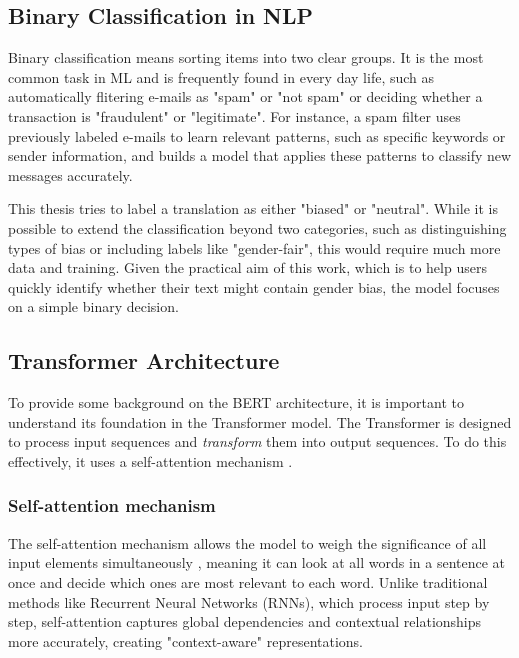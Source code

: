 \subsection{Binary Classification in NLP}
    Binary classification means sorting items into two clear groups. It is the most common task in ML and is frequently found in every day life, such as automatically flitering e-mails as "spam" or "not spam" \parencite{quemyBinaryClassificationUnstructured2019} or deciding whether a transaction is "fraudulent" or "legitimate". For instance, a spam filter uses previously labeled e-mails to learn relevant patterns, such as specific keywords or sender information, and builds a model that applies these patterns to classify new messages accurately. 
    
    This thesis tries to label a translation as either "biased" or "neutral". While it is possible to extend the classification beyond two categories, such as distinguishing types of bias or including labels like "gender-fair", this would require much more data and training. Given the practical aim of this work, which is to help users quickly identify whether their text might contain gender bias, the model focuses on a simple binary decision.

\subsection{Transformer Architecture} \label{subsection:transformer_arch}
  To provide some background on the BERT architecture, it is important to understand its foundation in the Transformer model. The Transformer is designed to process input sequences and \textit{transform} them into output sequences. To do this effectively, it uses a self-attention mechanism \parencite{phuongFormalAlgorithmsTransformers2022}.

    \subsubsection{Self-attention mechanism}
    The self-attention mechanism allows the model to weigh the significance of all input elements simultaneously \parencite{xiaoIntroductionTransformersNLP2023}, meaning it can look at all words in a sentence at once and decide which ones are most relevant to each word. Unlike traditional methods like Recurrent Neural Networks (RNNs), which process input step by step, self-attention captures global dependencies and contextual relationships more accurately, creating "context-aware" representations.


